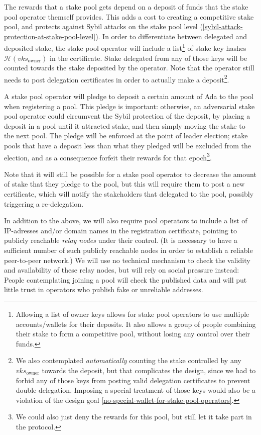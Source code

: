 \documentclass[11pt,a4paper]{article}
\begin{document}
The rewards that a stake pool gets depend on a deposit of funds that the
stake pool operator themself provides. This adds a cost to creating a
competitive stake pool, and protects against Sybil attacks on the stake
pool level (\ref{sybil-attack-protection-at-stake-pool-level}). In order
to differentiate between delegated and deposited stake, the stake pool
operator will include a list\footnote{Allowing a list of owner keys
  allows for stake pool operators to use multiple accounts/wallets for
  their deposits. It also allows a group of people combining their stake
  to form a competitive pool, without losing any control over their
  funds.} of stake key hashes \(\mathcal{H}(vks_\text{owner})\) in the
certificate. Stake delegated from any of those keys will be counted
towards the stake deposited by the operator. Note that the operator
still needs to post delegation certificates in order to actually make a
deposit\footnote{We also contemplated \emph{automatically} counting the
  stake controlled by any \(vks_\text{owner}\) towards the deposit, but
  that complicates the design, since we had to forbid any of those keys
  from posting valid delegation certificates to prevent double
  delegation. Imposing a special treatment of those keys would also be a
  violation of the design goal
  \ref{no-special-wallet-for-stake-pool-operators}.}.

A stake pool operator will pledge to deposit a certain amount of Ada to
the pool when registering a pool. This pledge is important: otherwise,
an adversarial stake pool operator could circumvent the Sybil protection
of the deposit, by placing a deposit in a pool until it attracted stake,
and then simply moving the stake to the next pool. The pledge will be
enforced at the point of leader election; stake pools that have a
deposit less than what they pledged will be excluded from the election,
and as a consequence forfeit their rewards for that epoch\footnote{We
  could also just deny the rewards for this pool, but still let it take
  part in the protocol.}.

Note that it will still be possible for a stake pool operator to
decrease the amount of stake that they pledge to the pool, but this will
require them to post a new certificate, which will notify the
stakeholders that delegated to the pool, possibly triggering a
re-delegation.

In addition to the above, we will also require pool operators to include
a list of IP-adresses and/or domain names in the registration
certificate, pointing to publicly reachable \emph{relay nodes} under
their control. (It is necessary to have a sufficient number of such
publicly reachable nodes in order to establish a reliable peer-to-peer
network.) We will use no technical mechanism to check the validity and
availability of these relay nodes, but will rely on social pressure
instead: People contemplating joining a pool will check the published
data and will put little trust in operators who publish fake or
unreliable addresses.
\end{document}
